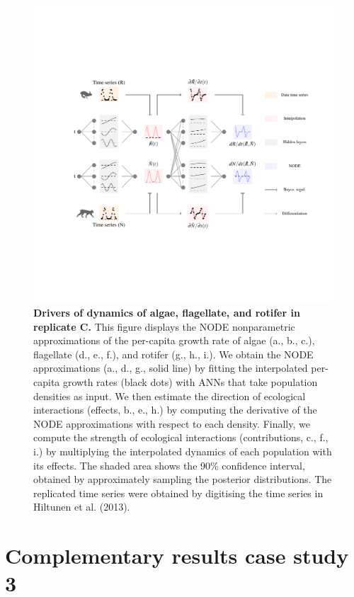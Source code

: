 \documentclass[11pt, oneside]{article}
\begin{document}
\newpage
\begin{figure}[H]
\includegraphics[width=1\linewidth,page=15]{figures/main.pdf}
\caption{
    \textbf{Drivers of dynamics of algae, flagellate, and rotifer in replicate C.}
    This figure displays the NODE nonparametric approximations of the per-capita growth rate of algae (a., b., c.), flagellate (d., e., f.), and rotifer (g., h., i.).
    We obtain the NODE approximations (a., d., g., solid line) by fitting the interpolated per-capita growth rates (black dots) with ANNs that take population densities as input.
    We then estimate the direction of ecological interactions (effects, b., e., h.) by computing the derivative of the NODE approximations with respect to each density.
    Finally, we compute the strength of ecological interactions (contributions, c., f., i.) by multiplying the interpolated dynamics of each population with its effects.
    The shaded area shows the 90\% confidence interval, obtained by approximately sampling the posterior distributions. 
    The replicated time series were obtained by digitising the time series in Hiltunen et al. (2013).
}
\end{figure}
\newpage

\section{Complementary results case study 3}
\end{document}
